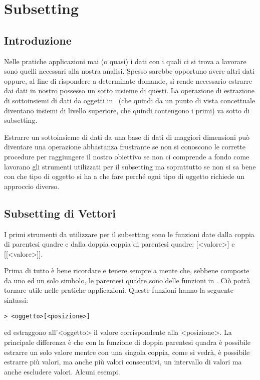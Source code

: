 \chapter{Subsetting}
\section{Introduzione}

Nelle pratiche applicazioni mai (o quasi) i dati con i quali ci si trova a lavorare sono quelli necessari alla nostra analisi. Spesso sarebbe opportuno avere altri dati oppure, al fine di rispondere a determinate domande, si rende necessario estrarre dai dati in nostro possesso un sotto insieme di questi. La operazione di estrazione di sottoinsiemi di dati da oggetti in \erre\ (che quindi da un punto di vista concettuale diventano insiemi di livello superiore, che quindi contengono i primi) va sotto di subsetting.

Estrarre un sottoinsieme di dati da una base di dati di maggiori dimensioni può diventare una operazione abbastanza frustrante se non si conoscono le corrette procedure per raggiungere il nostro obiettivo se non ci comprende a fondo come lavorano gli strumenti utilizzati per il subsetting ma soprattutto se non si sa bene con che tipo di oggetto si ha a che fare perché ogni tipo di oggetto richiede un approccio diverso.

\section{Subsetting di Vettori}
I primi strumenti da utilizzare per il subsetting sono le funzioni date dalla coppia di parentesi quadre e dalla doppia coppia di parentesi quadre: [<valore>] e [[<valore>]].

Prima di tutto è bene ricordare e tenere sempre a mente che, sebbene composte da uno ed un solo simbolo, le parentesi quadre sono delle funzioni in \erre. Ciò potrà tornare utile nelle pratiche applicazioni. Queste funzioni hanno la seguente sintassi:
\begin{lstlisting}
> <oggetto>[<posizione>]
\end{lstlisting}
ed estraggono all'<oggetto> il valore corrispondente alla <posizione>. La principale differenza è che con la funzione di doppia parentesi quadra è possibile estrarre un solo valore mentre con una singola coppia, come si vedrà, è possibile estrarre più valori, ma anche più valori consecutivi, un intervallo di valori ma anche escludere valori. Alcuni esempi.

